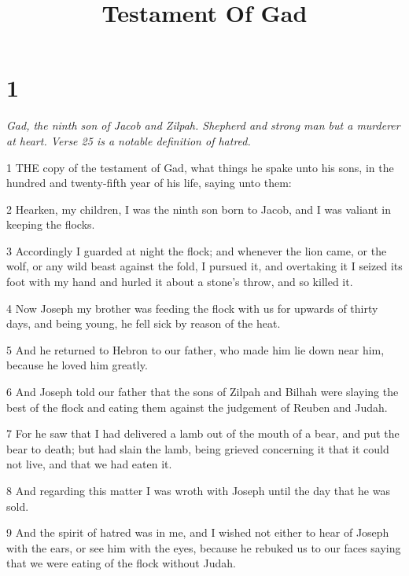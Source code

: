 

\title{Testament Of Gad}

\chapter{1}

\par \textit{Gad, the ninth son of Jacob and Zilpah. Shepherd and strong man but a murderer at heart. Verse 25 is a notable definition of hatred.}

\par 1 THE copy of the testament of Gad, what things he spake unto his sons, in the hundred and twenty-fifth year of his life, saying unto them:

\par 2 Hearken, my children, I was the ninth son born to Jacob, and I was valiant in keeping the flocks.

\par 3 Accordingly I guarded at night the flock; and whenever the lion came, or the wolf, or any wild beast against the fold, I pursued it, and overtaking it I seized its foot with my hand and hurled it about a stone's throw, and so killed it.

\par 4 Now Joseph my brother was feeding the flock with us for upwards of thirty days, and being young, he fell sick by reason of the heat.

\par 5 And he returned to Hebron to our father, who made him lie down near him, because he loved him greatly.

\par 6 And Joseph told our father that the sons of Zilpah and Bilhah were slaying the best of the flock and eating them against the judgement of Reuben and Judah.

\par 7 For he saw that I had delivered a lamb out of the mouth of a bear, and put the bear to death; but had slain the lamb, being grieved concerning it that it could not live, and that we had eaten it.

\par 8 And regarding this matter I was wroth with Joseph until the day that he was sold.

\par 9 And the spirit of hatred was in me, and I wished not either to hear of Joseph with the ears, or see him with the eyes, because he rebuked us to our faces saying that we were eating of the flock without Judah.

